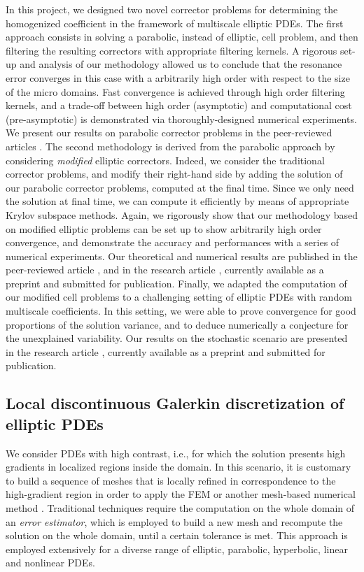 \documentclass[10pt]{article}
\begin{document}
In this project, we designed two novel corrector problems for determining the homogenized coefficient in the framework of multiscale elliptic PDEs. The first approach consists in solving a parabolic, instead of elliptic, cell problem, and then filtering the resulting correctors with appropriate filtering kernels. A rigorous set-up and analysis of our methodology allowed us to conclude that the resonance error converges in this case with a arbitrarily high order with respect to the size of the micro domains. Fast convergence is achieved through high order filtering kernels, and a trade-off between high order (asymptotic) and computational cost (pre-asymptotic) is demonstrated via thoroughly-designed numerical experiments. We present our results on parabolic corrector problems in the peer-reviewed articles \cite{AAP19,AAP21}. The second methodology is derived from the parabolic approach by considering \textit{modified} elliptic correctors. Indeed, we consider the traditional corrector problems, and modify their right-hand side by adding the solution of our parabolic corrector problems, computed at the final time. Since we only need the solution at final time, we can compute it efficiently by means of appropriate Krylov subspace methods. Again, we rigorously show that our methodology based on modified elliptic problems can be set up to show arbitrarily high order convergence, and demonstrate the accuracy and performances with a series of numerical experiments. Our theoretical and numerical results are published in the peer-reviewed article \cite{AAP19}, and in the research article \cite{AAP20}, currently available as a preprint and submitted for publication. Finally, we adapted the computation of our modified cell problems to a challenging setting of elliptic PDEs with random multiscale coefficients. In this setting, we were able to prove convergence for good proportions of the solution variance, and to deduce numerically a conjecture for the unexplained variability. Our results on the stochastic scenario are presented in the research article \cite{AAP20b}, currently available as a preprint and submitted for publication.

\subsection{Local discontinuous Galerkin discretization of elliptic PDEs}\label{sec:Rosilho_1}

We consider PDEs with high contrast, i.e., for which the solution presents high gradients in localized regions inside the domain. In this scenario, it is customary to build a sequence of meshes that is locally refined in correspondence to the high-gradient region in order to apply the FEM or another mesh-based numerical method \cite{AiO00,Ver13,Ver94}. Traditional techniques require the computation on the whole domain of an \textit{error estimator}, which is employed to build a new mesh and recompute the solution on the whole domain, until a certain tolerance is met. This approach is employed extensively for a diverse range of elliptic, parabolic, hyperbolic, linear and nonlinear PDEs. 
\end{document}

